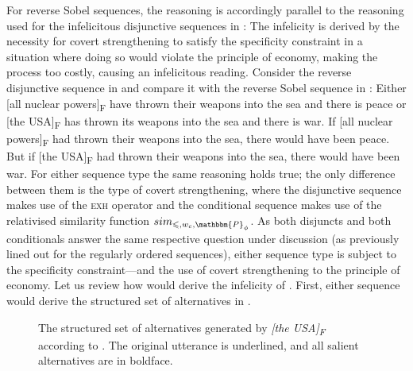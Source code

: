 For reverse Sobel sequences, the reasoning is accordingly parallel to the reasoning used for the infelicitous disjunctive sequences in : The infelicity is derived by the necessity for covert strengthening to satisfy the specificity constraint in a situation where doing so would violate the principle of economy, making the process too costly, causing an infelicitous reading. Consider the reverse disjunctive sequence in  and compare it with the reverse Sobel sequence in :
\ex{}
\ljudge{\#}Either [all nuclear powers]\textsubscript{F} have thrown their weapons into the sea and there is peace or [the USA]\textsubscript{F} has thrown its weapons into the sea and there is war.
\xe
\pex[nopreamble=true]\label{ex:ippolito-reverseSS}%
\a{} If [all nuclear powers]\textsubscript{F} had thrown their weapons into the sea, there would have been peace.
\a{} \ljudge{\#}But if [the USA]\textsubscript{F} had thrown their weapons into the sea, there would have been war.
\xe
For either sequence type the same reasoning holds true; the only difference between them is the type of covert strengthening, where the disjunctive sequence makes use of the {\scshape exh} operator and the conditional sequence makes use of the relativised similarity function $sim_{\leqslant,w_c,\mathbbm{P}_\phi}$. As both disjuncts and both conditionals answer the same respective question under discussion (as previously lined out for the regularly ordered sequences), either sequence type is subject to the specificity constraint---and the use of covert strengthening to the principle of economy. Let us review how \textcite{Ippolito2020} would derive the infelicity of . First, either sequence would derive the structured set of alternatives in .
\begin{figure}[!htb]
    \centering\hspace{-2cm}
    
    \caption{The structured set of alternatives generated by \textit{[the USA]\textsubscript{F}} according to \textcite{Ippolito2020}. The original utterance is underlined, and all salient alternatives are in boldface.}
\end{figure}

